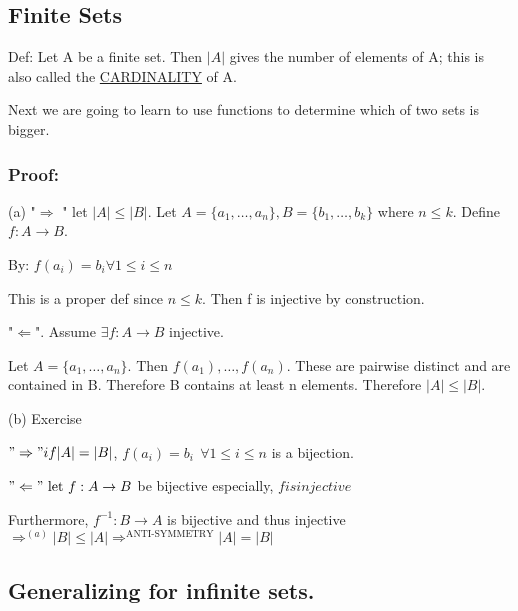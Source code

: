 \documentclass{article}
\begin{document}
\subsection*{Finite Sets}

Def: Let A be a finite set. Then $|A|$ gives the number of elements of A; this is also called the \underline{CARDINALITY} of A.

Next we are going to learn to use functions to determine which of two sets is bigger.


\subsubsection{Proof:}

(a) "$\Rightarrow$ " let $|A| \leq |B|.$ Let $A = \{a_1, \dots, a_n\}, B = \{b_1, \dots, b_k\}$ where $n \leq k$.
Define $f:A \to B$.

By: $f(a_i) = b_i \forall 1 \leq i \leq n$

This is a proper def since  $n \leq k$. Then f is injective by construction.

"$\Leftarrow$". Assume $\exists f: A \to B$ injective.

Let $A = \{a_1, \dots, a_n\}.$ Then $f(a_1), \dots, f(a_n)$. These are pairwise distinct and are contained in B. Therefore B contains at least n elements. Therefore  $|A| \leq |B|$.

(b) Exercise

$"\Rightarrow" if |A| = |B|$, $f(a_i) = b_i \ \ \forall 1 \leq i \leq n$ is a bijection.

$"\Leftarrow" \ \text{let} \ f: A \to B$ be bijective especially, $f is injective $

Furthermore,  $f^{-1}: B \to A$ is bijective and thus injective $\Rightarrow^{(a)} |B| \leq |A| \Rightarrow^{\text{ANTI-SYMMETRY}} |A| = |B|$

\subsection*{Generalizing for infinite sets.}
\end{document}
